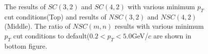 \begin{figure}[p]
\begin{center}
        \caption{The results of $SC(3,2)$ and $SC(4,2)$ with various minimum $p_T$ cut conditions(Top) and results of  $NSC(3,2)$ and $NSC(4,2)$(Middle). The ratio of $NSC(m,n)$ results with various minimum $p_T$ cut conditions to default($0.2 < p_T < 5.0$GeV/$c$ are shown in bottom figure.}
        \label{fig:ptdephigh}
        \end{center}   
     \end{figure}


